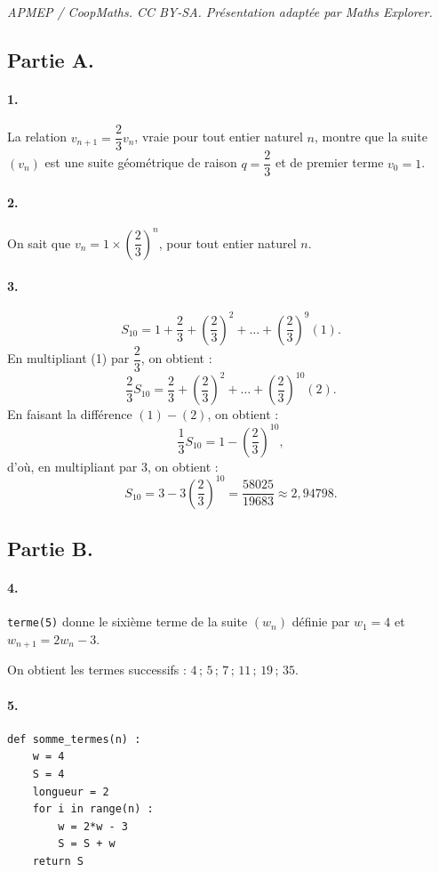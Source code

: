 \documentclass[10pt]{article}
\begin{document}
\noindent\textit{APMEP / CoopMaths. CC BY-SA. Présentation adaptée par Maths Explorer.}\par\medskip
\subsection*{Partie A.}

\paragraph{1.} La relation \(v_{n+1} = \dfrac{2}{3} v_n\), vraie pour tout entier naturel \(n\), montre que la suite \((v_n)\) est une suite géométrique de raison \(q = \dfrac{2}{3}\) et de premier terme \(v_0 = 1\).

\paragraph{2.} On sait que \(v_n = 1 \times \left(\dfrac{2}{3}\right)^n\), pour tout entier naturel \(n\).

\paragraph{3.}
\[
S_{10} = 1 + \dfrac{2}{3} + \left(\dfrac{2}{3}\right)^2 + \dots + \left(\dfrac{2}{3}\right)^9 (1).
\]
En multipliant (1) par \(\dfrac{2}{3}\), on obtient :
\[
\dfrac{2}{3} S_{10} = \dfrac{2}{3} + \left(\dfrac{2}{3}\right)^2 + \dots + \left(\dfrac{2}{3}\right)^{10} (2).
\]
En faisant la différence \((1) - (2)\), on obtient :
\[
\dfrac{1}{3} S_{10} = 1 - \left(\dfrac{2}{3}\right)^{10},
\]
d'où, en multipliant par \(3\), on obtient :
\[
S_{10} = 3 - 3\left(\dfrac{2}{3}\right)^{10} = \dfrac{58025}{19683} \approx 2{,}94798.
\]

\subsection*{Partie B.}

\paragraph{4.} \texttt{terme(5)} donne le sixième terme de la suite \((w_n)\) définie par \(w_1 = 4\) et \(w_{n+1} = 2w_n - 3\).

On obtient les termes successifs : \(4\,;\,5\,;\,7\,;\,11\,;\,19\,;\,35\).

\paragraph{5.}

\begin{center}
\begin{lstlisting}[style=python]
def somme_termes(n) :	
	w = 4
	S = 4
	longueur = 2
	for i in range(n) :
		w = 2*w - 3
		S = S + w
	return S
\end{lstlisting}
\end{center}
\end{document}
